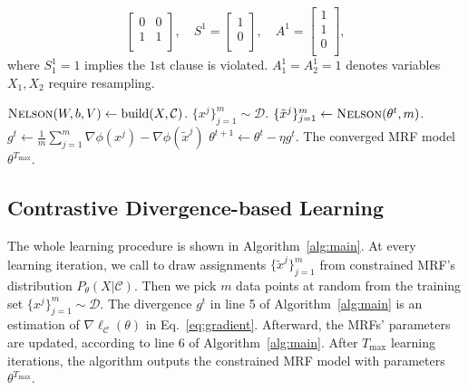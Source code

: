 \begin{example}
\begin{equation*}
\begin{bmatrix}
            0 & 0 \\
            1 & 1 \\
        \end{bmatrix},\quad
        S^1=\begin{bmatrix}
            1 \\
            0 \\
        \end{bmatrix},\quad
        A^1=\begin{bmatrix}
            1 \\
            1 \\
            0 \\
        \end{bmatrix},
    \end{equation*}
    where $S^1_{1}=1$ implies the $1$st clause is violated. $A^1_{1}=A^1_{2}=1$ denotes variables $X_1,X_2$ require resampling.
\end{example}

\begin{algorithm}[!t]
    \caption{Learn Constrained MRFs via \nls-CD.}\label{alg:main}
    \begin{algorithmic}[1]
        \State  $\textsc{Nelson}(W, b, V)\leftarrow \text{build}(X,\mathcal{C})$. 
        \State  $\{{x}^j\}_{j=1}^m\sim \mathcal{D}$. 
        \State $\{\tilde{x}^j\}_{j=1}^m\leftarrow\textsc{Nelson}(\theta^t, m)$. 
        \State  $g^t\leftarrow \frac{1}{m}\sum_{j=1}^m \nabla\phi(x^j)- \nabla\phi(\tilde{x}^j)$ 
        \State $\theta^{t+1}\leftarrow \theta^{t}-\eta g^t$. 
        \EndFor
        \Return  The converged MRF model $\theta^{T_{\max}}$.
    \end{algorithmic}
\end{algorithm}

\subsection{Contrastive Divergence-based Learning}
The whole learning procedure is shown in Algorithm~\ref{alg:main}. At every
learning iteration, we call \nls to draw assignments $\{\tilde{x}^j\}_{j=1}^m$
from constrained MRF's distribution $P_{\theta}(X|\mathcal{C})$.
%
Then we pick $m$ data points at random from the training set
$\{x^j\}_{j=1}^m\sim \mathcal{D}$. The divergence $g^t$ in line 5 of
Algorithm~\ref{alg:main} is an estimation of $\nabla\ell_{\mathcal{C}}(\theta)$
in Eq.~\eqref{eq:gradient}. Afterward, the MRFs' parameters are updated,
according to line 6 of Algorithm~\ref{alg:main}. After $T_{\max}$ learning
iterations, the algorithm outputs the constrained MRF model with parameters
$\theta^{T_{\max}}$.

